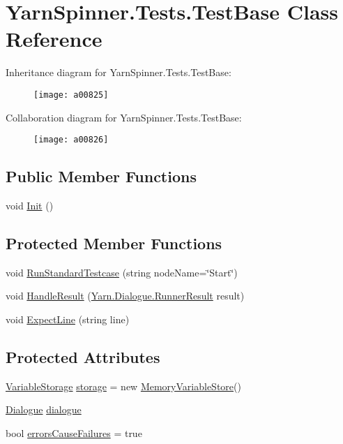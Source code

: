 \hypertarget{a00170}{\section{Yarn\-Spinner.\-Tests.\-Test\-Base Class Reference}
\label{a00170}
}


Inheritance diagram for Yarn\-Spinner.\-Tests.\-Test\-Base\-:
\nopagebreak
\begin{figure}[H]
\begin{center}
\leavevmode
\texttt{[image: a00825]}
\end{center}
\end{figure}


Collaboration diagram for Yarn\-Spinner.\-Tests.\-Test\-Base\-:
\nopagebreak
\begin{figure}[H]
\begin{center}
\leavevmode
\texttt{[image: a00826]}
\end{center}
\end{figure}
\subsection*{Public Member Functions}
\begin{DoxyCompactItemize}
\item 
void \hyperlink{a00170_a357a0dab579f9e45666c10779683dc27}{Init} ()
\end{DoxyCompactItemize}
\subsection*{Protected Member Functions}
\begin{DoxyCompactItemize}
\item 
void \hyperlink{a00170_abffa134d40d72b21e6b35c3bf05fc53f}{Run\-Standard\-Testcase} (string node\-Name=\char`\"{}Start\char`\"{})
\item 
void \hyperlink{a00170_a7b525f85a26d7c942e1cbfa5d6453893}{Handle\-Result} (\hyperlink{a00156}{Yarn.\-Dialogue.\-Runner\-Result} result)
\item 
void \hyperlink{a00170_ac21a5082ddac1da9db17ae54038df44e}{Expect\-Line} (string line)
\end{DoxyCompactItemize}
\subsection*{Protected Attributes}
\begin{DoxyCompactItemize}
\item 
\hyperlink{a00190}{Variable\-Storage} \hyperlink{a00170_a23d59ace1516ca72924c6fe3feafd3f7}{storage} = new \hyperlink{a00136}{Memory\-Variable\-Store}()
\item 
\hyperlink{a00092}{Dialogue} \hyperlink{a00170_a4cff5de56c4b8a91c76b6eb2d622a795}{dialogue}
\item 
bool \hyperlink{a00170_ac978fe85db843c51411f5517bdbe0eb8}{errors\-Cause\-Failures} = true
\end{DoxyCompactItemize}

